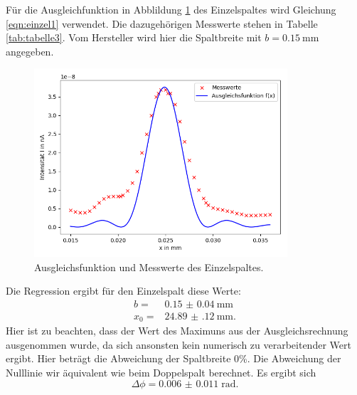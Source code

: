 Für die Ausgleichfunktion in Abblildung \ref{fig:plot3} des Einzelspaltes
wird Gleichung \ref{eqn:einzel1} verwendet.
Die dazugehörigen Messwerte stehen in Tabelle \ref{tab:tabelle3}.
Vom Hersteller wird hier die Spaltbreite mit $b=\SI{0,15}{\mm}$ angegeben.


\begin{figure}
  \centering
  \includegraphics[height=7cm]{Figure_4.png}
  \caption{Ausgleichsfunktion und Messwerte des Einzelspaltes.}
  \label{fig:plot3}
\end{figure}

Die Regression ergibt für den Einzelspalt diese Werte:
\begin{align*}
  b =&\SI{0.15(4)}{\mm}\\
  x_{0} =&\SI{24.89(12)}{\mm}.
\end{align*}
Hier ist zu beachten, dass der Wert des Maximuns aus der Ausgleichsrechnung ausgenommen
wurde, da sich ansonsten kein numerisch zu verarbeitender Wert ergibt.
Hier beträgt die Abweichung der Spaltbreite 0\%.
Die Abweichung der Nulllinie wir äquivalent wie beim Doppelspalt berechnet.
Es ergibt sich
\begin{equation*}
  \Delta \phi= \SI{0.006(11)}\; \text{rad}.
\end{equation*}

